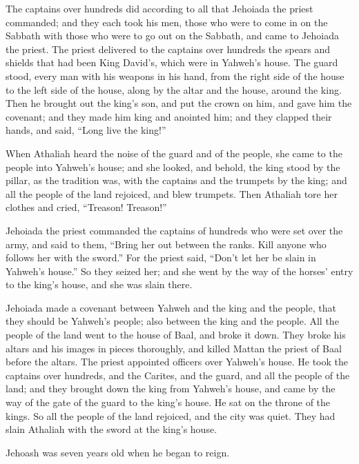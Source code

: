  The captains over hundreds did according to all that
Jehoiada the priest commanded; and they each took his men, those who
were to come in on the Sabbath with those who were to go out on the
Sabbath, and came to Jehoiada the priest.  The priest
delivered to the captains over hundreds the spears and shields that had
been King David's, which were in Yahweh's house.  The
guard stood, every man with his weapons in his hand, from the right side
of the house to the left side of the house, along by the altar and the
house, around the king.  Then he brought out the king's
son, and put the crown on him, and gave him the covenant; and they made
him king and anointed him; and they clapped their hands, and said,
``Long live the king!''

 When Athaliah heard the noise of the guard and of the
people, she came to the people into Yahweh's house;  and
she looked, and behold, the king stood by the pillar, as the tradition
was, with the captains and the trumpets by the king; and all the people
of the land rejoiced, and blew trumpets. Then Athaliah tore her clothes
and cried, ``Treason! Treason!''

 Jehoiada the priest commanded the captains of hundreds
who were set over the army, and said to them, ``Bring her out between
the ranks. Kill anyone who follows her with the sword.'' For the priest
said, ``Don't let her be slain in Yahweh's house.''  So
they seized her; and she went by the way of the horses' entry to the
king's house, and she was slain there.

 Jehoiada made a covenant between Yahweh and the king and
the people, that they should be Yahweh's people; also between the king
and the people.  All the people of the land went to the
house of Baal, and broke it down. They broke his altars and his images
in pieces thoroughly, and killed Mattan the priest of Baal before the
altars. The priest appointed officers over Yahweh's house.
 He took the captains over hundreds, and the Carites, and
the guard, and all the people of the land; and they brought down the
king from Yahweh's house, and came by the way of the gate of the guard
to the king's house. He sat on the throne of the kings. 
So all the people of the land rejoiced, and the city was quiet. They had
slain Athaliah with the sword at the king's house.

 Jehoash was seven years old when he began to reign.

